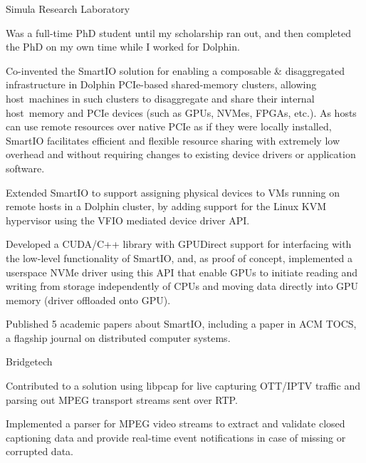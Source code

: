 \begin{experience}{Simula Research Laboratory}{
}
    \item{Was a full-time PhD student until my scholarship ran out, and then completed the PhD on my own time while I worked for Dolphin.}
    \item{Co-invented the SmartIO solution for enabling a composable \& disaggregated infrastructure in Dolphin PCIe-based shared-memory clusters, allowing host~machines in such clusters to disaggregate and share their internal host~memory and PCIe devices (such as GPUs, NVMes, FPGAs, etc.). %
        As hosts can use remote resources over native PCIe as if they were locally installed, SmartIO facilitates efficient and flexible resource sharing with extremely low overhead and without requiring changes to existing device drivers or application software.}
    \item{Extended SmartIO to support assigning physical devices to VMs running on remote hosts in a Dolphin cluster, by adding support for the Linux KVM hypervisor using the VFIO mediated device driver API.}
    \item{Developed a CUDA/C++ library with GPUDirect support for interfacing with the low-level functionality of SmartIO, and, as proof of concept, implemented a userspace NVMe driver using this API that enable GPUs to initiate reading and writing from storage independently of CPUs and moving data directly into GPU memory (driver offloaded onto GPU).}
    \item{Published 5 academic papers about SmartIO, including a paper in ACM TOCS, a flagship journal on distributed computer systems.}
\end{experience}

\begin{experience}{Bridgetech}{}
    \item{Contributed to a solution using libpcap for live capturing OTT/IPTV traffic and parsing out MPEG transport streams sent over RTP.}
    \item{Implemented a parser for MPEG video streams to extract and validate closed captioning data and provide real-time event notifications in case of missing or corrupted data.}
\end{experience}




